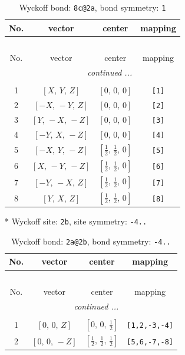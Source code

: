 \documentclass[fleqn,8pt]{jsarticle}
\begin{document}
\renewcommand{\arraystretch}{1.2}
\begin{longtable}{cccc}
\caption{Wyckoff bond: {\tt 8c@2a}, bond symmetry: {\tt 1}}
 \\
 \hline \hline
No. & vector & center & mapping \\ \hline \endfirsthead

\multicolumn{3}{l}{\tablename\ \thetable{}} \\
 \hline \hline
No. & vector & center & mapping \\ \hline \endhead

 \hline \hline
\multicolumn{3}{r}{\footnotesize\it continued ...} \\ \endfoot

 \hline \hline
\multicolumn{3}{r}{} \\ \endlastfoot

1 & $\left[ X,\, Y,\, Z \right]$ & $\left[ 0,\, 0,\, 0 \right]$ & {\tt [1]} \\ \hline
2 & $\left[ - X,\, - Y,\, Z \right]$ & $\left[ 0,\, 0,\, 0 \right]$ & {\tt [2]} \\ \hline
3 & $\left[ Y,\, - X,\, - Z \right]$ & $\left[ 0,\, 0,\, 0 \right]$ & {\tt [3]} \\ \hline
4 & $\left[ - Y,\, X,\, - Z \right]$ & $\left[ 0,\, 0,\, 0 \right]$ & {\tt [4]} \\ \hline
5 & $\left[ - X,\, Y,\, - Z \right]$ & $\left[ \frac{1}{2},\, \frac{1}{2},\, 0 \right]$ & {\tt [5]} \\ \hline
6 & $\left[ X,\, - Y,\, - Z \right]$ & $\left[ \frac{1}{2},\, \frac{1}{2},\, 0 \right]$ & {\tt [6]} \\ \hline
7 & $\left[ - Y,\, - X,\, Z \right]$ & $\left[ \frac{1}{2},\, \frac{1}{2},\, 0 \right]$ & {\tt [7]} \\ \hline
8 & $\left[ Y,\, X,\, Z \right]$ & $\left[ \frac{1}{2},\, \frac{1}{2},\, 0 \right]$ & {\tt [8]} \\
\end{longtable}
* Wyckoff site: {\tt 2b}, site symmetry: {\tt -4..}
\renewcommand{\arraystretch}{1.2}
\begin{longtable}{cccc}
\caption{Wyckoff bond: {\tt 2a@2b}, bond symmetry: {\tt -4..}}
 \\
 \hline \hline
No. & vector & center & mapping \\ \hline \endfirsthead

\multicolumn{3}{l}{\tablename\ \thetable{}} \\
 \hline \hline
No. & vector & center & mapping \\ \hline \endhead

 \hline \hline
\multicolumn{3}{r}{\footnotesize\it continued ...} \\ \endfoot

 \hline \hline
\multicolumn{3}{r}{} \\ \endlastfoot

1 & $\left[ 0,\, 0,\, Z \right]$ & $\left[ 0,\, 0,\, \frac{1}{2} \right]$ & {\tt [1,2,-3,-4]} \\ \hline
2 & $\left[ 0,\, 0,\, - Z \right]$ & $\left[ \frac{1}{2},\, \frac{1}{2},\, \frac{1}{2} \right]$ & {\tt [5,6,-7,-8]} \\
\end{longtable}
\end{document}
